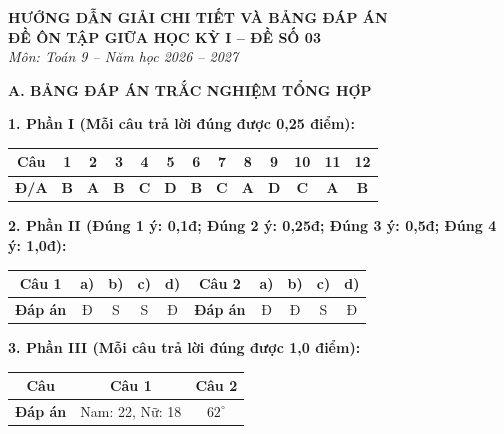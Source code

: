 \documentclass[12pt,a4paper]{article}
\begin{document}
\begin{center}
  \textbf{\Large HƯỚNG DẪN GIẢI CHI TIẾT VÀ BẢNG ĐÁP ÁN}\\
  \textbf{\large ĐỀ ÔN TẬP GIỮA HỌC KỲ I -- ĐỀ SỐ 03}\\
  \textit{Môn: Toán 9 -- Năm học 2026 -- 2027}
\end{center}
\vspace{2mm}

\noindent\textbf{\large A. BẢNG ĐÁP ÁN TRẮC NGHIỆM TỔNG HỢP}
\vspace{1mm}

\noindent\textbf{1. Phần I (Mỗi câu trả lời đúng được 0,25 điểm):}
\begin{center}
\begin{tabular}{|c|c|c|c|c|c|c|c|c|c|c|c|c|}
\hline
\textbf{Câu} & \textbf{1} & \textbf{2} & \textbf{3} & \textbf{4} & \textbf{5} & \textbf{6} & \textbf{7} & \textbf{8} & \textbf{9} & \textbf{10} & \textbf{11} & \textbf{12} \\
\hline
\textbf{Đ/A} & \textbf{B} & \textbf{A} & \textbf{B} & \textbf{C} & \textbf{D} & \textbf{B} & \textbf{C} & \textbf{A} & \textbf{D} & \textbf{C} & \textbf{A} & \textbf{B} \\
\hline
\end{tabular}
\end{center}
\vspace{0.5mm}

\noindent\textbf{2. Phần II (Đúng 1 ý: 0,1đ; Đúng 2 ý: 0,25đ; Đúng 3 ý: 0,5đ; Đúng 4 ý: 1,0đ):}
\begin{center}
\begin{tabular}{|c|c|c|c|c||c|c|c|c|c|}
\hline
\textbf{Câu 1} & \textbf{a)} & \textbf{b)} & \textbf{c)} & \textbf{d)} & \textbf{Câu 2} & \textbf{a)} & \textbf{b)} & \textbf{c)} & \textbf{d)} \\
\hline
\textbf{Đáp án} & Đ & S & S & Đ & \textbf{Đáp án} & Đ & Đ & S & Đ \\
\hline
\end{tabular}
\end{center}
\vspace{0.5mm}

\noindent\textbf{3. Phần III (Mỗi câu trả lời đúng được 1,0 điểm):}
\begin{center}
\begin{tabular}{|c|c|c|}
\hline
\textbf{Câu} & \textbf{Câu 1} & \textbf{Câu 2} \\
\hline
\textbf{Đáp án} & Nam: 22, Nữ: 18 & $62^\circ$ \\
\hline
\end{tabular}
\end{center}
\vspace{2mm}
\end{document}
